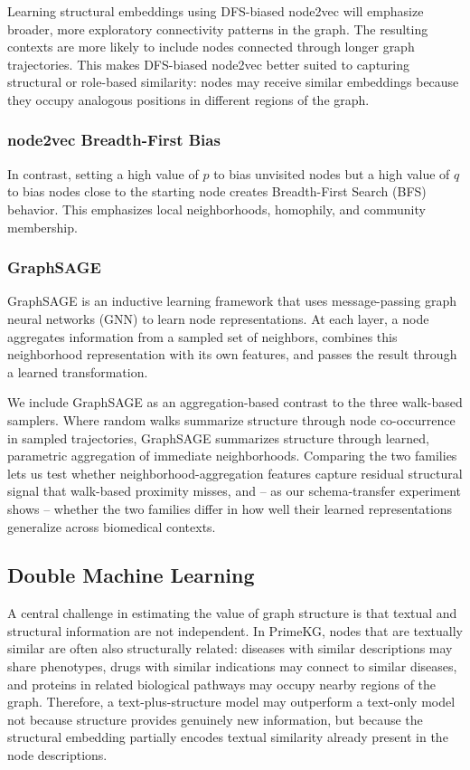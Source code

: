 \documentclass{article}
\theoremstyle{plain}
\theoremstyle{definition}
\theoremstyle{remark}
\begin{document}
Learning structural embeddings using DFS-biased node2vec will emphasize broader, more exploratory connectivity patterns in the graph. The resulting contexts are more likely to include nodes connected through longer graph trajectories. This makes DFS-biased node2vec better suited to capturing structural or role-based similarity: nodes may receive similar embeddings because they occupy analogous positions in different regions of the graph.

\subsubsection{node2vec Breadth-First Bias}

In contrast, setting a high value of $p$ to bias unvisited nodes but a high value of $q$ to bias nodes close to the starting node creates Breadth-First Search (BFS) behavior. This emphasizes local neighborhoods, homophily, and community membership.

\subsubsection{GraphSAGE}

GraphSAGE \citep{graphsage} is an inductive learning framework that uses message-passing graph neural networks (GNN) to learn node representations. At each layer, a node aggregates information from a sampled set of neighbors, combines this neighborhood representation with its own features, and passes the result through a learned transformation.

We include GraphSAGE as an aggregation-based contrast to the three walk-based samplers. Where random walks summarize structure through node co-occurrence in sampled trajectories, GraphSAGE summarizes structure through learned, parametric aggregation of immediate neighborhoods. Comparing the two families lets us test whether neighborhood-aggregation features capture residual structural signal that walk-based proximity misses, and -- as our schema-transfer experiment shows -- whether the two families differ in how well their learned representations generalize across biomedical contexts.

\subsection{Double Machine Learning}

A central challenge in estimating the value of graph structure is that textual and structural information are not independent. In PrimeKG, nodes that are textually similar are often also structurally related: diseases with similar descriptions may share phenotypes, drugs with similar indications may connect to similar diseases, and proteins in related biological pathways may occupy nearby regions of the graph. Therefore, a text-plus-structure model may outperform a text-only model not because structure provides genuinely new information, but because the structural embedding partially encodes textual similarity already present in the node descriptions.
\end{document}
